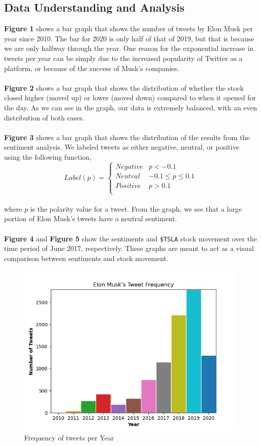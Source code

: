 \documentclass[12pt, notitlepage]{article}
\begin{document}
\subsection{Data Understanding and Analysis}
\textbf{Figure 1} shows a bar graph that shows the number of tweets by Elon Musk per year since 2010. The bar for 2020 is only half of that of 2019, but that is because we are only halfway through the year. One reason for the exponential increase in tweets per year can be simply due to the increased popularity of Twitter as a platform, or because of the success of Musk's companies.\\\\
\textbf{Figure 2} shows a bar graph that shows the distribution of whether the stock closed higher (moved up) or lower (moved down) compared to when it opened for the day. As we can see in the graph, our data is extremely balanced, with an even distribution of both cases.\\\\
\textbf{Figure 3} shows a bar graph that shows the distribution of the results from the sentiment analysis. We labeled tweets as either negative, neutral, or positive using the following function,
\[ Label(p) = \begin{cases} 
Negative & p < -0.1 \\
Neutral & -0.1 \leq p \leq 0.1\\
Positive & p > 0.1\\
\end{cases}
\]\\
where $p$ is the polarity value for a tweet. From the graph, we see that a large portion of Elon Musk's tweets have a neutral sentiment.\\\\
\textbf{Figure 4} and \textbf{Figure 5} show the sentiments and \texttt{\$TSLA} stock movement over the time period of June 2017, respectively. These graphs are meant to act as a visual comparison between sentiments and stock movement.
\begin{figure}[H]
	\centering
	\includegraphics[scale=0.8]{images/Frequency.png}
	\caption{Frequency of tweets per Year}
	\label{fig:F}
\end{figure}
\end{document}
